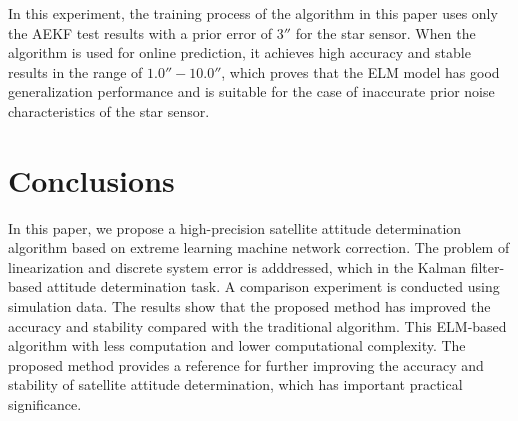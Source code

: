 \documentclass{article}
\begin{document}
	In this experiment, the training process of the algorithm in this paper uses only the AEKF test results with a prior error of $ 3'' $ for the star sensor. When the algorithm is used for online prediction, it achieves high accuracy and stable results in the range of $ 1.0''-10.0'' $, which proves that the ELM model has good generalization performance and is suitable for the case of inaccurate prior noise characteristics of the star sensor.
	
	\section{Conclusions}
	\label{sec:con}
	
	In this paper, we propose a high-precision satellite attitude determination algorithm based on extreme learning machine network correction. The problem of linearization and discrete system error is adddressed, which in the Kalman filter-based attitude determination task. A comparison experiment is conducted using simulation data. The results show that the proposed method has improved the accuracy and stability compared with the traditional algorithm. This ELM-based algorithm with less computation and lower computational complexity. The proposed method provides a reference for further improving the accuracy and stability of satellite attitude determination, which has important practical significance.
	
	
	
	
\end{document}
